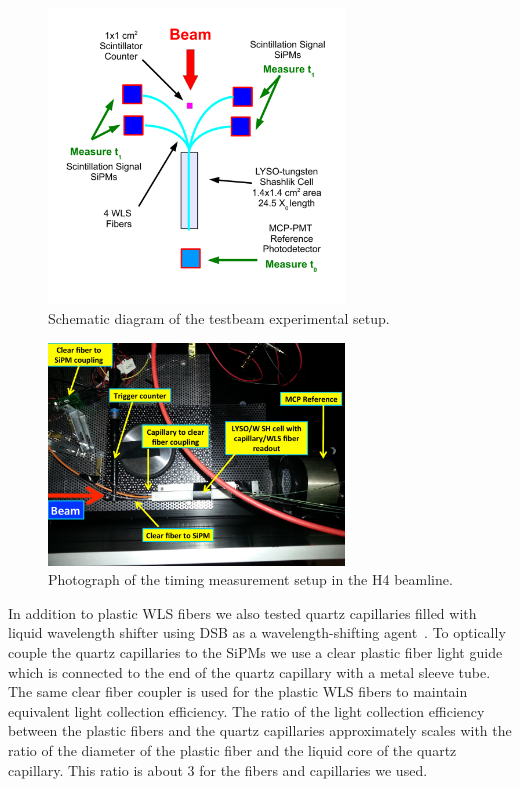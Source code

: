 \begin{figure}[htbp] 
\centering
\includegraphics[width=0.70\textwidth]{figures/ShashlikFiberSetupSchematic} 
\caption{Schematic diagram of the testbeam experimental setup.} 
\label{fig:TestbeamSchematic} 
\end{figure} 

\begin{figure}[htbp] 
\centering
\includegraphics[width=0.70\textwidth]{figures/ShashlikTBSetupDiagram} 
\caption{Photograph of the timing measurement setup in the H4 beamline.} 
\label{fig:TestbeamSetup} 
\end{figure} 

In addition to plastic WLS fibers we also tested quartz capillaries filled with
liquid wavelength shifter using DSB as a wavelength-shifting
agent~\cite{Baumbaugh:2016vcg}. To optically couple the quartz capillaries to the
SiPMs we use a clear plastic fiber light guide which is connected to the end of
the quartz capillary with a metal sleeve tube. The same clear fiber coupler is
used for the plastic WLS fibers to maintain equivalent light collection
efficiency. The ratio of the light collection efficiency between the plastic
fibers and the quartz capillaries approximately scales with the ratio of the
diameter of the plastic fiber and the liquid core of the quartz capillary. This
ratio is about $3$ for the fibers and capillaries we used.

